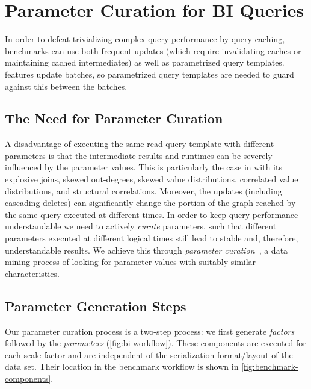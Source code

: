 \section{Parameter Curation for BI Queries}
\label{sec:paramgen}

In order to defeat trivializing complex query performance by query caching, benchmarks can use both frequent updates (which require invalidating caches or maintaining cached intermediates) as well as parametrized query templates.
\snbbi features update batches, so parametrized query templates are needed to guard against this between the batches.

\subsection{The Need for Parameter Curation}

A disadvantage of executing the same read query template with different parameters is that the intermediate results and runtimes can be severely influenced by the parameter values.
This is particularly the case in \snbbi with its explosive joins, skewed out-degrees, skewed value distributions, correlated value distributions, and structural correlations.
Moreover, the updates (including cascading deletes) can significantly change the portion of the graph reached by the same query executed at different times. %
In order to keep query performance understandable we need to actively {\em curate} parameters, such that different parameters executed at different logical times %
still lead to stable and, therefore, understandable results.
We achieve this through \emph{parameter curation}~\cite{DBLP:conf/tpctc/GubichevB14,DBLP:conf/sigmod/ErlingALCGPPB15}, a data mining process of looking for parameter values with suitably similar characteristics.

\subsection{Parameter Generation Steps}
\label{sec:parameter-curation-method}

Our parameter curation process is a two-step process:
we first generate \emph{factors} followed by the \emph{parameters} (\autoref{fig:bi-workflow}).
These components are executed for each scale factor and are independent of the serialization format/layout of the data set.
Their location in the benchmark workflow is shown in \autoref{fig:benchmark-components}.

